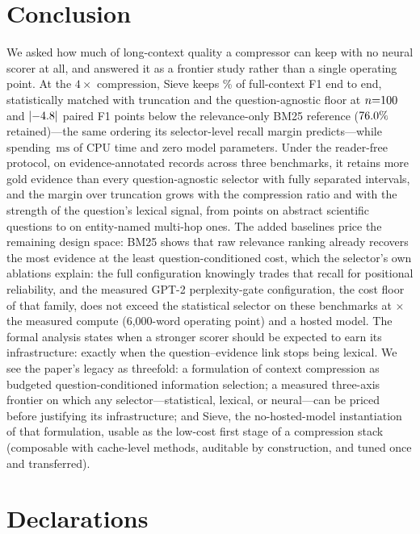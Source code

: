 \documentclass[preprint,12pt]{elsarticle}
\DeclarePairedDelimiter\abs{\lvert}{\rvert}
\theoremstyle{remark}
\newcommand{\method}{Sieve}
\newcommand{\ms}{\ensuremath{\mathrm{ms}}}
\begin{document}
\section{Conclusion}
\label{sec:conclusion}
We asked how much of long-context quality a compressor can keep with
no neural scorer at all, and answered it as a frontier study rather
than a single operating point. At the $4\times$ compression,
\method{} keeps \QASieRetain\% of full-context F1 end to end,
statistically matched with truncation and the question-agnostic floor
at $n{=}100$ and $\abs{\QAPairSBm}$ paired F1 points below the
relevance-only BM25 reference ($76.0\%$ retained)---the same
ordering its selector-level recall margin predicts---while
spending \TimeSieSixk\,\ms{} of CPU time and zero model parameters.
Under the reader-free protocol, on \TotalRecords{}
evidence-annotated records across three benchmarks, it retains more
gold evidence than every question-agnostic selector with fully
separated intervals, and the margin over truncation grows with the
compression ratio and with the strength of the question's lexical
signal, from \PairQSH{} points on abstract scientific questions to
\PairHSH{} on entity-named multi-hop ones. The added baselines price
the remaining design space: BM25 shows that raw relevance ranking
already recovers the most evidence at the least
question-conditioned cost, which the selector's own ablations explain:
the full configuration knowingly trades that recall for
positional reliability, and the measured GPT-2 perplexity-gate
configuration, the cost floor of that family, does not exceed the
statistical selector on these benchmarks at
\GateSieRatioSixk$\times$ the measured compute (6{,}000-word operating
point) and a hosted model. The formal analysis states when a stronger
scorer should be expected to earn its infrastructure: exactly when the
question--evidence link stops being lexical. We see the paper's
legacy as threefold: a formulation of context compression as budgeted
question-conditioned information selection; a measured three-axis
frontier on which any selector---statistical, lexical, or neural---can
be priced before justifying its infrastructure; and \method{}, the
no-hosted-model instantiation of that formulation, usable as the
low-cost first stage of a compression stack (composable with
cache-level methods, auditable by construction, and tuned once and
transferred).

\section*{Declarations}
\end{document}

